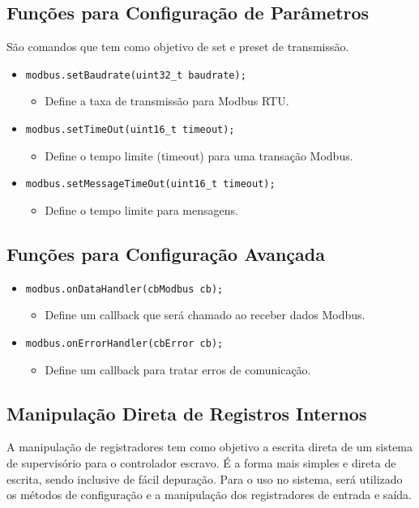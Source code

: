 \subsection{Funções para Configuração de Parâmetros}
São comandos que tem como objetivo de set e preset de transmissão. 
\begin{itemize}
    \item \texttt{modbus.setBaudrate(uint32\_t baudrate);}
    \begin{itemize}
        \item Define a taxa de transmissão para Modbus RTU.
    \end{itemize}
    \item \texttt{modbus.setTimeOut(uint16\_t timeout);}
    \begin{itemize}
        \item Define o tempo limite (timeout) para uma transação Modbus.
    \end{itemize}
    \item \texttt{modbus.setMessageTimeOut(uint16\_t timeout);}
    \begin{itemize}
        \item Define o tempo limite para mensagens.
    \end{itemize}
\end{itemize}

\subsection{Funções para Configuração Avançada}
\begin{itemize}
    \item \texttt{modbus.onDataHandler(cbModbus cb);}
    \begin{itemize}
        \item Define um callback que será chamado ao receber dados Modbus.
    \end{itemize}
    \item \texttt{modbus.onErrorHandler(cbError cb);}
    \begin{itemize}
        \item Define um callback para tratar erros de comunicação.
    \end{itemize}
\end{itemize}

\subsection{Manipulação Direta de Registros Internos}
A manipulação de registradores tem como objetivo a escrita direta de um sistema de supervisório para o controlador escravo. É a forma mais simples e direta de escrita, sendo inclusive de fácil depuração. Para o uso no sistema, será utilizado os métodos de configuração e a manipulação dos registradores de entrada e saída.
